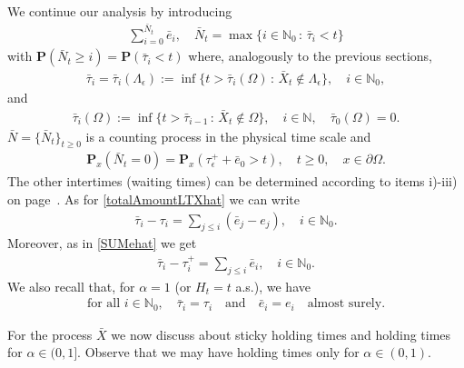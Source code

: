 \documentclass[11pt,a4paper]{article}
\newcommand{\magenta}{black}
\begin{document}
{\color{\magenta} We continue our analysis by introducing 
\begin{align}
\label{totalAmountLTXbar}
\sum_{i=0}^{\bar{N}_t} \bar{e}_i, \quad \bar{N}_t = \max \{ i \in \mathbb{N}_0\,:\, \bar{\tau}_i < t\}
\end{align}
with $\mathbf{P}(\bar{N}_t \geq i) = \mathbf{P}(\bar{\tau}_i < t)$ where, analogously to the previous sections, 
\begin{align*}
\bar{\tau}_i = \bar{\tau}_i (\Lambda_\epsilon) := \inf\{t>\bar{\tau}_i(\Omega)\,:\, \bar{X}_t \notin \Lambda_\epsilon\}, \quad i \in \mathbb{N}_0,
\end{align*} 
and
\begin{align*}
\bar{\tau}_i(\Omega) := \inf\{t > \bar{\tau}_{i-1} \, : \, \bar{X}_t \notin \Omega\}, \quad i \in \mathbb{N},\quad \bar{\tau}_0(\Omega) = 0.
\end{align*}
$\bar{N}=\{\bar{N}_t\}_{t \geq 0}$ is a counting process in the physical time scale and
\begin{align*}
\mathbf{P}_x(\bar{N}_t = 0) = \mathbf{P}_x(\tau^+_\epsilon + \bar{e}_0 > t), \quad t \geq 0, \quad x \in \partial \Omega.
\end{align*}
The other intertimes (waiting times) can be determined according to items i)-iii) on page~\pageref{propertiesSeqSHT}. As for \eqref{totalAmountLTXhat} we can write
\begin{align*}
\bar{\tau}_i - \tau_i = \sum_{j \leq i} (\bar{e}_j - e_j), \quad i \in \mathbb{N}_0.
\end{align*}
Moreover, as in \eqref{SUMehat} we get
\begin{align}
\bar{\tau}_i - \tau^+_i = \sum_{j \leq i} \bar{e}_i, \quad i \in \mathbb{N}_0.
\label{SUMebar}
\end{align}  
We also recall that, for $\alpha = 1$ (or $H_t = t$ a.s.), we have
\begin{align*}
\textrm{for all $i \in \mathbb{N}_0$}, \quad \bar{\tau}_i = \tau_i \quad \textrm{and} \quad \bar{e}_i = e_i  \quad \textrm{almost surely}.  
\end{align*} 
}


For the process $\bar{X}$ we now discuss about sticky holding times and holding times for $\alpha \in (0,1]$. Observe that we may have holding times only for $\alpha \in (0,1)$. 
\end{document}
